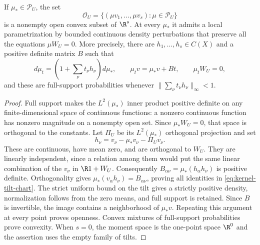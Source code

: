 \begin{lemma}
\label{lem:kernel-moment-chart}
If $\mu_*\in\mathcal P_U$, the set
\[
 \mathcal O_U=\{(\mu v_1,\ldots,\mu v_s):\mu\in\mathcal P_U\}
\]
is a nonempty open convex subset of $\R^s$. At every $\mu_*$ it admits
a local parametrization by bounded continuous density perturbations
that preserve all the equations $\mu W_U=0$. More precisely, there are
$h_1,\ldots,h_s\in C(X)$ and a positive definite matrix $B$ such that
\begin{equation}\label{eq:kernel-tilt-chart}
 d\mu_t=(1+\textstyle\sum_\nu t_\nu h_\nu)d\mu_*,\qquad
 \mu_t v=\mu_*v+Bt,\qquad \mu_t W_U=0,
\end{equation}
and these are full-support probabilities whenever
$\|\sum_\nu t_\nu h_\nu\|_\infty<1$.
\end{lemma}
\begin{proof}
Full support makes the $L^2(\mu_*)$ inner product positive definite on
any finite-dimensional space of continuous functions: a nonzero
continuous function has nonzero magnitude on a nonempty open set.
Since $\mu_*W_U=0$, that space is orthogonal to the constants. Let
$\Pi_U$ be its $L^2(\mu_*)$ orthogonal projection and set
\[
 h_\nu=v_\nu-\mu_*v_\nu-\Pi_U v_\nu.
\]
These are continuous, have mean zero, and are orthogonal to $W_U$.
They are linearly independent, since a relation among them would put
the same linear combination of the $v_\nu$ in $\R1+W_U$.
Consequently $B_{\alpha\nu}=\mu_*(h_\alpha h_\nu)$ is positive
definite. Orthogonality gives
$\mu_*(v_\alpha h_\nu)=B_{\alpha\nu}$, proving all identities in
\eqref{eq:kernel-tilt-chart}. The strict uniform bound on the tilt
gives a strictly positive density, normalization follows from the
zero means, and full support is retained. Since $B$ is invertible,
the image contains a neighborhood of $\mu_*v$. Repeating this argument
at every point proves openness. Convex mixtures of full-support
probabilities prove convexity. When $s=0$, the moment space is the
one-point space $\R^0$ and the assertion uses the empty family of tilts.
\end{proof}

